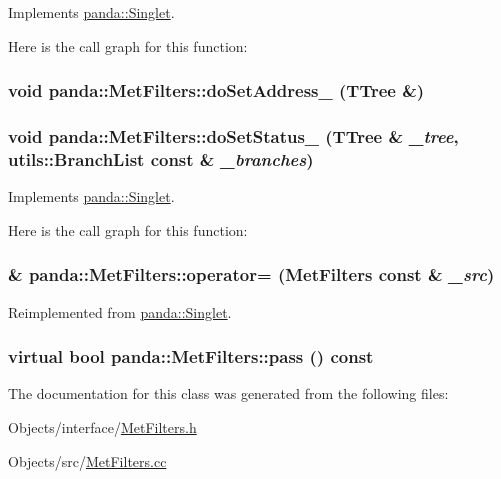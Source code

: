 Implements \hyperlink{classpanda_1_1Singlet_ad5acaa19bf3a8c360cf2e36604ab4530}{panda::Singlet}.

Here is the call graph for this function:\hypertarget{classpanda_1_1MetFilters_a152d3969ea9e1518b8fceda3bc93bf81}{
\subsubsection[{doSetAddress\_\-}]{\setlength{\rightskip}{0pt plus 5cm}void panda::MetFilters::doSetAddress\_\- (TTree \&)}}
\label{classpanda_1_1MetFilters_a152d3969ea9e1518b8fceda3bc93bf81}
\hypertarget{classpanda_1_1MetFilters_a48c76c6289784dda542350d88e05aa66}{
\subsubsection[{doSetStatus\_\-}]{\setlength{\rightskip}{0pt plus 5cm}void panda::MetFilters::doSetStatus\_\- (TTree \& {\em \_\-tree}, \/  {\bf utils::BranchList} const \& {\em \_\-branches})}}
\label{classpanda_1_1MetFilters_a48c76c6289784dda542350d88e05aa66}


Implements \hyperlink{classpanda_1_1Singlet_a660799e379f7949f3b8e2d74f6e1ddb2}{panda::Singlet}.

Here is the call graph for this function:\hypertarget{classpanda_1_1MetFilters_a7afdb0c8ff9d453cb699a8895ac07afa}{
\subsubsection[{operator=}]{ \& panda::MetFilters::operator= ({\bf MetFilters} const \& {\em \_\-src})}}
\label{classpanda_1_1MetFilters_a7afdb0c8ff9d453cb699a8895ac07afa}


Reimplemented from \hyperlink{classpanda_1_1Singlet_a161b3df14c430fd7f1afdd64d098b211}{panda::Singlet}.\hypertarget{classpanda_1_1MetFilters_a36ea7af365dd672dddcdb1ed4e5b8a82}{
\subsubsection[{pass}]{\setlength{\rightskip}{0pt plus 5cm}virtual bool panda::MetFilters::pass () const}}
\label{classpanda_1_1MetFilters_a36ea7af365dd672dddcdb1ed4e5b8a82}


The documentation for this class was generated from the following files:\begin{DoxyCompactItemize}
\item 
Objects/interface/\hyperlink{MetFilters_8h}{MetFilters.h}\item 
Objects/src/\hyperlink{MetFilters_8cc}{MetFilters.cc}\end{DoxyCompactItemize}
